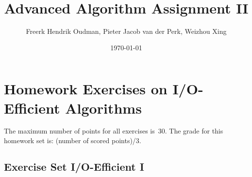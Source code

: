 \documentclass{article}
\title{Advanced Algorithm Assignment II}
\author{Freerk Hendrik Oudman, Pieter Jacob van der Perk, Weizhou Xing}
\date{\today}
\begin{document}
\maketitle

\section*{Homework Exercises on I/O-Efficient Algorithms}
The maximum number of points for all exercises is~30.
The grade for this homework set is: (number of scored points)/3.

\newcommand{\setnr}{IO.I}
\subsection*{Exercise Set I/O-Efficient I}
\end{document}
